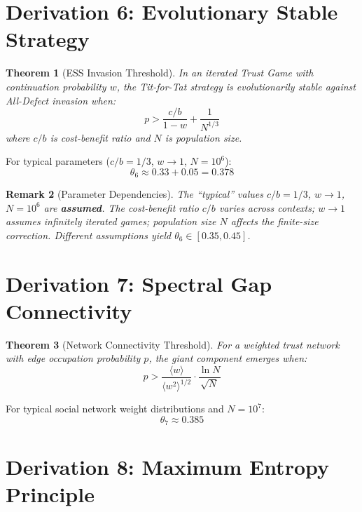 \documentclass[11pt,twocolumn]{article}
\newtheorem{theorem}{Theorem}[section]
\newtheorem{remark}[theorem]{Remark}
\begin{document}
\section{Derivation 6: Evolutionary Stable Strategy}

\begin{theorem}[ESS Invasion Threshold]
\label{thm:ess}
In an iterated Trust Game with continuation probability $w$, the Tit-for-Tat strategy is evolutionarily stable against All-Defect invasion when:
\begin{equation}
p > \frac{c/b}{1 - w} + \frac{1}{N^{1/3}}
\end{equation}
where $c/b$ is cost-benefit ratio and $N$ is population size.
\end{theorem}

For typical parameters ($c/b = 1/3$, $w \to 1$, $N = 10^6$):
\begin{equation}
\theta_6 \approx 0.33 + 0.05 = \mathbf{0.378}
\end{equation}

\begin{remark}[Parameter Dependencies]
The ``typical'' values $c/b = 1/3$, $w \to 1$, $N = 10^6$ are \textbf{assumed}. The cost-benefit ratio $c/b$ varies across contexts; $w \to 1$ assumes infinitely iterated games; population size $N$ affects the finite-size correction. Different assumptions yield $\theta_6 \in [0.35, 0.45]$.
\end{remark}

\section{Derivation 7: Spectral Gap Connectivity}

\begin{theorem}[Network Connectivity Threshold]
\label{thm:spectral}
For a weighted trust network with edge occupation probability $p$, the giant component emerges when:
\begin{equation}
p > \frac{\langle w \rangle}{\langle w^2 \rangle^{1/2}} \cdot \frac{\ln N}{\sqrt{N}}
\end{equation}
\end{theorem}

For typical social network weight distributions and $N = 10^7$:
\begin{equation}
\theta_7 \approx \mathbf{0.385}
\end{equation}

\section{Derivation 8: Maximum Entropy Principle}
\end{document}
